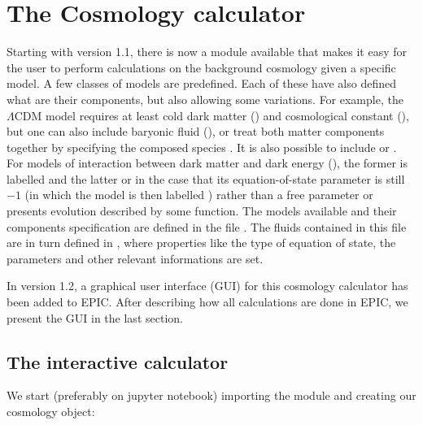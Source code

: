 \documentclass[letterpaper,12pt,english]{sphinxhowto}
\begin{document}
\section{The Cosmology calculator}
\label{\detokenize{cosmology:cosmology-module}}\label{\detokenize{cosmology::doc}}\label{\detokenize{cosmology:the-cosmology-calculator}}
Starting with version 1.1, there is now a module available that makes it easy
for the user to perform calculations on the background cosmology given a
specific model.
A few classes of models are predefined. Each of these have also defined what
are their components, but also allowing some variations.
For example, the \(\Lambda\text{CDM}\) model requires at least cold dark
matter () and cosmological constant (), but one can also
include baryonic fluid (), or treat both matter components together
by specifying the composed species .
It is also possible to include  or .
For models of interaction between dark matter and dark energy (), the
former is labelled  and the latter  or  in the case
that its equation-of-state parameter is still \(-1\) (in which the model is
then labelled ) rather than a free parameter or presents
evolution described by some function.
The models available and their components specification are defined in the file
. The fluids contained in this file are in
turn defined in , where properties like
the type of equation of state, the parameters and other relevant informations
are set.

In version 1.2, a graphical user interface (GUI) for this cosmology calculator
has been added to EPIC.
After describing how all calculations are done in EPIC, we present the GUI in
the last section.


\subsection{The interactive calculator}
\label{\detokenize{cosmology_module:the-interactive-calculator}}\label{\detokenize{cosmology_module::doc}}
We start (preferably on jupyter notebook) importing the module and
creating our cosmology object:
\end{document}
